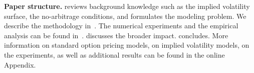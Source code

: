 


\textbf{Paper structure.}
 reviews background knowledge such as the implied volatility surface, the no-arbitrage conditions, and formulates the modeling problem.
We describe the methodology in~.
The numerical experiments and the empirical analysis can be found in~.
 discusses the broader impact.  concludes.
More information on standard option pricing models, on implied volatility models, on the experiments, as well as additional results can be found in the online Appendix.
